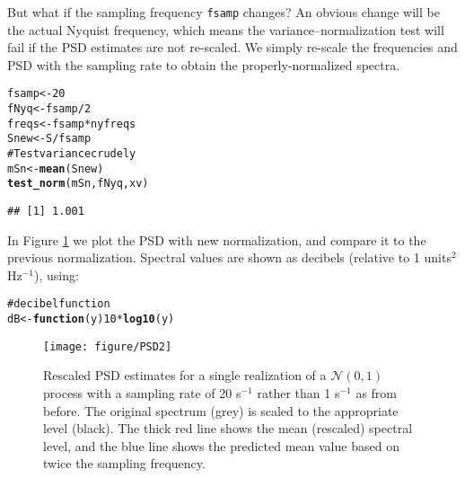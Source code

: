 \documentclass[10pt]{article}\usepackage{graphicx, color}
\makeatletter
\def\maxwidth{ %
  \ifdim\Gin@nat@width>\linewidth
    \linewidth
  \else
    \Gin@nat@width
  \fi
}
\newcommand{\hlfunctioncall}[1]{\textcolor[rgb]{0.501960784313725,0,0.329411764705882}{\textbf{#1}}}%
\newcommand{\hlcomment}[1]{\textcolor[rgb]{0.180392156862745,0.6,0.341176470588235}{#1}}%
\newenvironment{kframe}{%
 \def\at@end@of@kframe{}%
 \ifinner\ifhmode%
  \def\at@end@of@kframe{\end{minipage}}%
  \begin{minipage}{\columnwidth}%
 \fi\fi%
 \def\FrameCommand##1{\hskip\@totalleftmargin \hskip-\fboxsep
 \colorbox{shadecolor}{##1}\hskip-\fboxsep
     \hskip-\linewidth \hskip-\@totalleftmargin \hskip\columnwidth}%
 \MakeFramed {\advance\hsize-\width
   \@totalleftmargin\z@ \linewidth\hsize
   \@setminipage}}%
 {\par\unskip\endMakeFramed%
 \at@end@of@kframe}
\newenvironment{knitrout}{}{} %
\makeatother
\begin{document}
But what if the sampling frequency \texttt{fsamp} changes? An obvious change will be
the actual Nyquist frequency, which means the variance--normalization test will
fail if the PSD estimates are not re-scaled.  We simply re-scale the frequencies
and PSD
with the sampling rate
to obtain the properly-normalized spectra.

\begin{knitrout}
\color{fgcolor}\begin{kframe}
\begin{alltt}
fsamp <- 20
fNyq <- fsamp/2
freqs <- fsamp * nyfreqs
Snew <- S/fsamp
\hlcomment{# Test variance crudely}
mSn <- \hlfunctioncall{mean}(Snew)
\hlfunctioncall{test_norm}(mSn, fNyq, xv)
\end{alltt}
\begin{verbatim}
## [1] 1.001
\end{verbatim}
\end{kframe}
\end{knitrout}


In Figure \ref{fig:psdsamp} we
plot the PSD with new normalization, and compare it to
the previous normalization.
Spectral values are shown as
decibels (relative to 1 units$^2$ Hz$^{-1}$), using:

\begin{knitrout}
\color{fgcolor}\begin{kframe}
\begin{alltt}
\hlcomment{# decibel function}
dB <- \hlfunctioncall{function}(y) 10 * \hlfunctioncall{log10}(y)
\end{alltt}
\end{kframe}
\end{knitrout}

\begin{figure}[htb!]
\begin{center}
\begin{knitrout}
\color{fgcolor}
\texttt{[image: figure/PSD2]} 

\end{knitrout}

\caption{Rescaled PSD estimates for a single realization of a 
$\mathcal{N}(0,1)$ process with a sampling rate of 20 s$^{-1}$ rather
than 1 s$^{-1}$ as from before.  
The original spectrum (grey) is scaled to the appropriate level
(black).
The thick red line shows the mean (rescaled) spectral level, and the
blue line shows the predicted mean value based on twice the sampling
frequency.}
\label{fig:psdsamp}
\end{center}
\end{figure}
\end{document}
